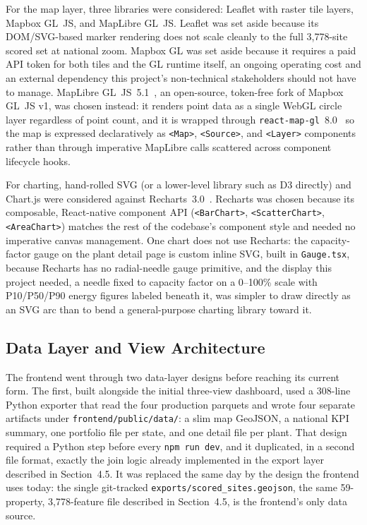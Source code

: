 \documentclass[12pt,letterpaper]{report}
\begin{document}
For the map layer, three libraries were considered: Leaflet with raster
tile layers, Mapbox GL~JS, and MapLibre GL~JS. Leaflet was set aside because
its DOM/SVG-based marker rendering does not scale cleanly to the full
3{,}778-site scored set at national zoom. Mapbox GL was set aside because it
requires a paid API token for both tiles and the GL runtime itself, an
ongoing operating cost and an external dependency this project's
non-technical stakeholders should not have to manage. MapLibre
GL~JS~5.1~\cite{maplibregl}, an open-source, token-free fork of Mapbox GL~JS
v1, was chosen instead: it renders point data as a single WebGL circle layer
regardless of point count, and it is wrapped through
\texttt{react-map-gl}~8.0~\cite{reactmapgl} so the map is expressed
declaratively as \texttt{<Map>}, \texttt{<Source>}, and \texttt{<Layer>}
components rather than through imperative MapLibre calls scattered across
component lifecycle hooks.

For charting, hand-rolled SVG (or a lower-level library such as D3 directly)
and Chart.js were considered against Recharts~3.0~\cite{recharts3}.
Recharts was chosen because its composable, React-native component API
(\texttt{<BarChart>}, \texttt{<ScatterChart>}, \texttt{<AreaChart>}) matches
the rest of the codebase's component style and needed no imperative canvas
management. One chart does not use Recharts: the capacity-factor gauge on
the plant detail page is custom inline SVG, built in \texttt{Gauge.tsx},
because Recharts has no radial-needle gauge primitive, and the display this
project needed, a needle fixed to capacity factor on a 0--100\% scale with
P10/P50/P90 energy figures labeled beneath it, was simpler to draw directly
as an SVG arc than to bend a general-purpose charting library toward it.

\subsection{Data Layer and View Architecture}

The frontend went through two data-layer designs before reaching its
current form. The first, built alongside the initial three-view dashboard,
used a 308-line Python exporter that read the four production parquets and
wrote four separate artifacts under \texttt{frontend/public/data/}: a slim
map GeoJSON, a national KPI summary, one portfolio file per state, and one
detail file per plant. That design required a Python step before every
\texttt{npm run dev}, and it duplicated, in a second file format, exactly
the join logic already implemented in the export layer described in
Section~4.5. It was replaced the same day by the design the frontend uses
today: the single git-tracked \texttt{exports/scored\_sites.geojson}, the
same 59-property, 3{,}778-feature file described in Section~4.5, is the
frontend's only data source.
\end{document}
